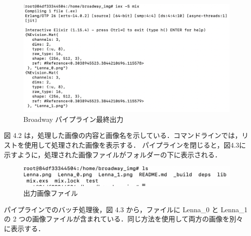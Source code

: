 \documentclass[a4paper]{jreport}	%
\begin{document}
\begin{figure}[H]
\vspace{5cm}
\begin{center}
\hspace{-8cm}
\includegraphics[scale=0.5]{ja/f9.png}
\end{center}
\caption{Broadway パイプライン最終出力}
\end{figure}

図 4.2 は，処理した画像の内容と画像名を示している．コマンドラインでは，リストを使用して処理された画像を表示する．
パイプラインを閉じると，図4.3に示すように，処理された画像ファイルがフォルダーの下に表示される．

\begin{figure}[H]
\begin{center}
\hspace{-8cm}
\includegraphics[scale=0.5]{ja/f8.png}
\end{center}
\caption{出力画像ファイル}
\end{figure}

パイプラインでのバッチ処理後，図 4.3 から，ファイルに Lenna\_0 と Lenna\_1 の 2 つの画像ファイルが含まれている．同じ方法を使用して両方の画像を別々に表示する．
\end{document}
